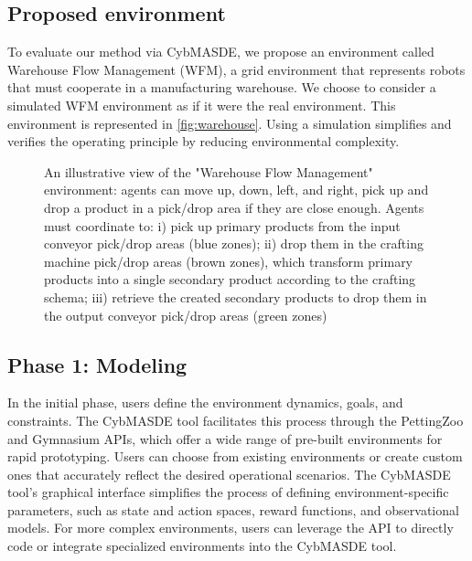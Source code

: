 \documentclass[sigconf,anonymous]{aamas}
\begin{document}
\subsection{Proposed environment}
To evaluate our method via CybMASDE, we propose an environment called Warehouse Flow Management (WFM), a grid environment that represents robots that must cooperate in a manufacturing warehouse. We choose to consider a simulated WFM environment as if it were the real environment. This environment is represented in \autoref{fig:warehouse}.
Using a simulation simplifies and verifies the operating principle by reducing environmental complexity.

\begin{figure}[h!]
  \centering
  
  \caption{An illustrative view of the "Warehouse Flow Management" environment: agents can move up, down, left, and right, pick up and drop a product in a pick/drop area if they are close enough. Agents must coordinate to: i) pick up primary products from the input conveyor pick/drop areas (blue zones); ii) drop them in the crafting machine pick/drop areas (brown zones), which transform primary products into a single secondary product according to the crafting schema; iii) retrieve the created secondary products to drop them in the output conveyor pick/drop areas (green zones)}
  \label{fig:warehouse}
\end{figure}

\subsection{Phase 1: Modeling}

In the initial phase, users define the environment dynamics, goals, and constraints. The CybMASDE tool facilitates this process through the PettingZoo and Gymnasium APIs, which offer a wide range of pre-built environments for rapid prototyping. Users can choose from existing environments or create custom ones that accurately reflect the desired operational scenarios. The CybMASDE tool's graphical interface simplifies the process of defining environment-specific parameters, such as state and action spaces, reward functions, and observational models. For more complex environments, users can leverage the API to directly code or integrate specialized environments into the CybMASDE tool.
\end{document}
